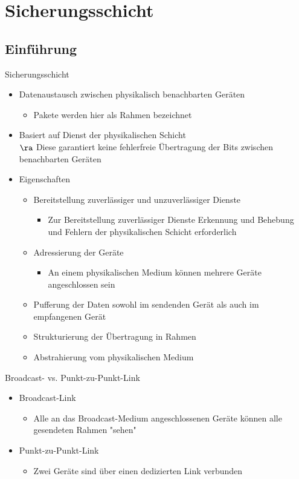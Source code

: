 \newpage
\section{Sicherungsschicht}
  \subsection{Einführung}
    Sicherungsschicht
    \begin{itemize}
      \item Datenaustausch zwischen physikalisch benachbarten Geräten
        \begin{itemize}
          \item Pakete werden hier als Rahmen bezeichnet
        \end{itemize}
      \item Basiert auf Dienst der physikalischen Schicht\\
        $\ra$ Diese garantiert keine fehlerfreie Übertragung der Bits zwischen benachbarten Geräten
      \item Eigenschaften
        \begin{itemize}
          \item Bereitstellung zuverlässiger und unzuverlässiger Dienste
            \begin{itemize}
              \item Zur Bereitstellung zuverlässiger Dienste Erkennung und Behebung und Fehlern der
                physikalischen Schicht erforderlich
            \end{itemize}
          \item Adressierung der Geräte
            \begin{itemize}
              \item An einem physikalischen Medium können mehrere Geräte angeschlossen sein
            \end{itemize}
          \item Pufferung der Daten sowohl im sendenden Gerät als auch im empfangenen Gerät
          \item Strukturierung der Übertragung in Rahmen
          \item Abstrahierung vom physikalischen Medium
        \end{itemize}
    \end{itemize}
    Broadcast- vs. Punkt-zu-Punkt-Link
    \begin{itemize}
      \item Broadcast-Link
        \begin{itemize}
          \item Alle an das Broadcast-Medium angeschlossenen Geräte können alle gesendeten Rahmen
            "sehen"
        \end{itemize}
      \item Punkt-zu-Punkt-Link
        \begin{itemize}
          \item Zwei Geräte sind über einen dedizierten Link verbunden
        \end{itemize}
    \end{itemize}
